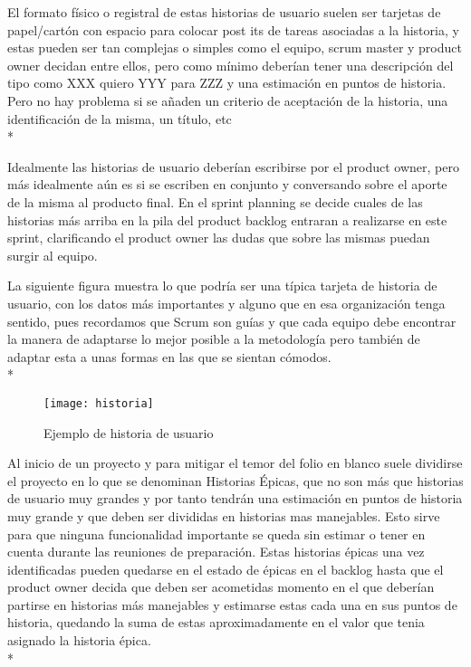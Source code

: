 \documentclass[../pfc.tex]{subfiles}
\begin{document}
	El formato físico o registral de estas historias de usuario suelen ser tarjetas de papel/cartón con espacio para colocar post its de tareas asociadas a la historia, y estas pueden ser tan complejas o simples como el equipo, scrum master y product owner decidan entre ellos, pero como mínimo deberían tener una descripción del tipo como XXX quiero YYY para ZZZ y una estimación en puntos de historia. Pero no hay problema si se añaden un criterio de aceptación de la historia, una identificación de la misma, un título, etc\\*
	
	Idealmente las historias de usuario deberían escribirse por el product owner, pero más idealmente aún es si se escriben en conjunto y conversando sobre el aporte de la misma al producto final. En el sprint planning se decide cuales de las historias más arriba en la pila del product backlog entraran a realizarse en este sprint, clarificando el product owner las dudas que sobre las mismas puedan surgir al equipo.
	
	La siguiente figura muestra lo que podría ser una típica tarjeta de historia de usuario, con los datos más importantes y alguno que en esa organización tenga sentido, pues recordamos que Scrum son guías y que cada equipo debe encontrar la manera de adaptarse lo mejor posible a la metodología pero también de adaptar esta a unas formas en las que se sientan cómodos. \\* 
	
	\begin{figure}[h]
		\centering
		\texttt{[image: historia]}
		\caption{Ejemplo de historia de usuario}
		\label{fig:ejemplo de historia de usuario}
	\end{figure}
	
	Al inicio de un proyecto y para mitigar el temor del folio en blanco suele dividirse el proyecto en lo que se denominan Historias Épicas, que no son más que historias de usuario muy grandes y por tanto tendrán una estimación en puntos de historia muy grande y que deben ser divididas en historias mas manejables. Esto sirve para que ninguna funcionalidad importante se queda sin estimar o tener en cuenta durante las reuniones de preparación. Estas historias épicas una vez identificadas pueden quedarse en el estado de épicas en el backlog hasta que el product owner decida que deben ser acometidas momento en el que deberían partirse en historias más manejables y estimarse estas cada una en sus puntos de historia, quedando la suma de estas aproximadamente en el valor que tenia asignado la historia épica.\\*
	
\end{document}
